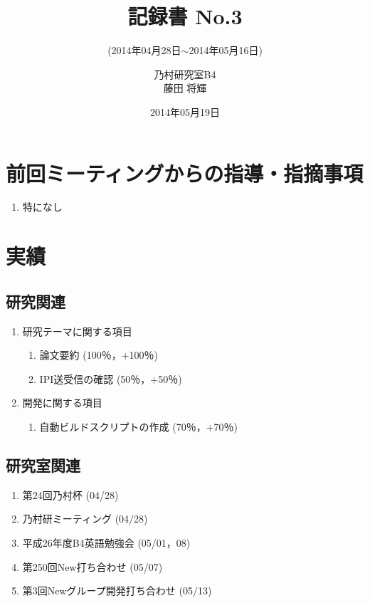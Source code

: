 \documentclass[fleqn, 14pt]{extarticle}
\subtitle{(2014年04月28日$\sim$2014年05月16日)}
\author{乃村研究室B4\\藤田 将輝}
\date{2014年05月19日}
\title{記録書 No.3}
\begin{document}
\maketitle




\section{前回ミーティングからの指導・指摘事項}
\label{sec-1}
\begin{enumerate}
\item 特になし
\end{enumerate}




\section{実績}
\label{sec-2}


\subsection{研究関連}
\label{sec-2-1}
\begin{enumerate}
\item 研究テーマに関する項目
\hfill
\label{enum-research1}
\begin{enumerate}

\item 論文要約
\hfill
\label{enum-1-A}
(100％，+100％)
\item IPI送受信の確認
\hfill
\label{enum-1-B}
(50％，+50％)
\end{enumerate}
\item 開発に関する項目
\hfill
\label{enum-research2}
\begin{enumerate}

\item 自動ビルドスクリプトの作成
\hfill
\label{enum-2-A}
(70％，+70％)
\end{enumerate}
\end{enumerate}


\subsection{研究室関連}
\label{sec-2-2}

\begin{enumerate}
\item 第24回乃村杯
\hfill
\label{enum-laboratory1}
(04/28)
\item 乃村研ミーティング
\hfill
\label{enum-laboratory2}
(04/28)
\item 平成26年度B4英語勉強会
\hfill
\label{enum-laboratory3}
(05/01，08)
\item 第250回New打ち合わせ
\hfill
\label{enum-laboratory4}
(05/07)
\item 第3回Newグループ開発打ち合わせ
\hfill
\label{enum-laboratory5}
(05/13)
\end{enumerate}
\end{document}
